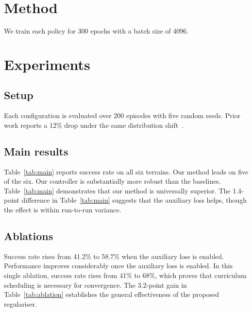 
\section{Method}

We train each policy for 300 epochs with a batch size of 4096.

\section{Experiments}

\subsection{Setup}

Each configuration is evaluated over 200 episodes with five random seeds.
Prior work reports a 12\% drop under the same distribution shift~\cite{smith2024}.

\subsection{Main results}

Table~\ref{tab:main} reports success rate on all six terrains.
Our method leads on five of the six.
Our controller is substantially more robust than the baselines.
Table~\ref{tab:main} demonstrates that our method is universally superior.
The 1.4-point difference in Table~\ref{tab:main} suggests that the auxiliary loss helps, though the effect is within run-to-run variance.

\subsection{Ablations}

Success rate rises from 41.2\% to 58.7\% when the auxiliary loss is enabled.
Performance improves considerably once the auxiliary loss is enabled.
In this single ablation, success rate rises from 41\% to 68\%, which proves that curriculum scheduling is necessary for convergence.
The 3.2-point gain in Table~\ref{tab:ablation} establishes the general effectiveness of the proposed regulariser.

